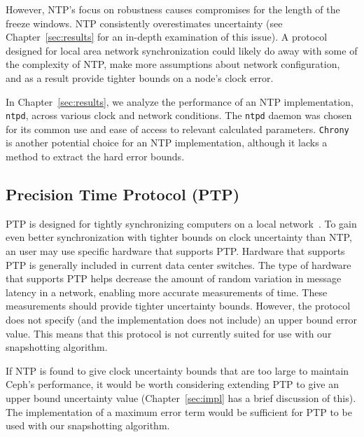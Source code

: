 However, NTP's focus on robustness
causes compromises for the length of the freeze windows. NTP consistently overestimates
uncertainty (see Chapter~\ref{sec:results} for an in-depth examination
of this issue). A protocol designed for local area network
synchronization could likely do away with some of the complexity of
NTP, make more assumptions about network configuration, and as a
result provide tighter bounds on a node's clock error.

In Chapter~\ref{sec:results}, we analyze the performance of an NTP
implementation, \texttt{ntpd}, across various clock and network
conditions. The \texttt{ntpd} daemon was chosen for its common use and
ease of access to relevant calculated parameters. \texttt{Chrony} is
another potential choice for an NTP implementation, although it lacks
a method to extract the hard error bounds.

\subsection{Precision Time Protocol (PTP)}

PTP is designed for tightly synchronizing
computers on a local network~\citep{2008}. To gain even better
synchronization with tighter bounds on clock uncertainty than NTP, an 
user may use specific hardware that supports PTP. Hardware that
supports PTP is generally included in current data center switches. 
The type of hardware that supports PTP helps decrease the
amount of random variation in message latency in a network, enabling
more accurate measurements of time.  These measurements should 
provide tighter uncertainty bounds. However, the
protocol does not specify (and the implementation does not include) an
upper bound error value. This means that this protocol is not
currently suited for use with our snapshotting algorithm.

If NTP is found to give clock uncertainty bounds that are too large to 
maintain Ceph's performance, it would be worth considering extending PTP to
give an upper bound uncertainty value (Chapter~\ref{sec:impl} has a
brief discussion of this). The implementation of a maximum error term
would be sufficient for PTP to be used with our snapshotting algorithm.


